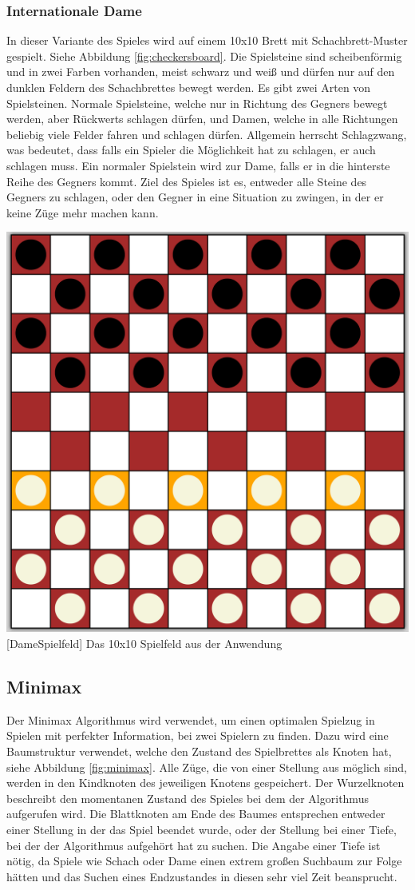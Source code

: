 \documentclass[12pt,a4paper,bibliography=totocnumbered,listof=totocnumbered]{article}
\begin{document}
\subsubsection{Internationale Dame}
In dieser Variante des Spieles wird auf einem 10x10 Brett mit Schachbrett-Muster gespielt.
Siehe Abbildung \ref{fig:checkersboard}. Die Spielsteine
sind scheibenförmig und in zwei Farben vorhanden, meist schwarz und weiß und dürfen nur auf den dunklen
Feldern des Schachbrettes bewegt werden. Es gibt zwei Arten von Spielsteinen. Normale Spielsteine, welche
nur in Richtung des Gegners bewegt werden, aber Rückwerts schlagen dürfen, und Damen, welche
in alle Richtungen beliebig viele Felder fahren und schlagen dürfen. Allgemein herrscht Schlagzwang,
was bedeutet, dass falls ein Spieler die Möglichkeit hat zu schlagen, er auch schlagen muss.
Ein normaler Spielstein wird zur Dame, falls er in die hinterste Reihe des Gegners kommt.
Ziel des Spieles ist es, entweder alle Steine des Gegners zu schlagen, oder den Gegner in eine Situation
zu zwingen, in der er keine Züge mehr machen kann. \cite{InternationalCheckersRules}

\vspace{1em}
\begin{minipage}{\linewidth}
	\centering
	\includegraphics[width=0.5\linewidth]{pics/checkersboard.png}
	[DameSpielfeld]{ Das 10x10 Spielfeld aus der Anwendung }
	\label{fig:checkersboard}
\end{minipage}

\subsection{Minimax}
\label{chap:Minimax}
Der Minimax Algorithmus wird verwendet, um einen optimalen Spielzug in Spielen mit perfekter Information, bei zwei Spielern
zu finden. Dazu wird eine Baumstruktur verwendet, welche den Zustand des Spielbrettes als Knoten hat, siehe Abbildung \ref{fig:minimax}.
Alle Züge, die von einer Stellung aus möglich sind, werden in den Kindknoten des jeweiligen Knotens gespeichert.
Der Wurzelknoten beschreibt den momentanen Zustand des Spieles bei dem der Algorithmus aufgerufen wird. Die Blattknoten am Ende des Baumes
entsprechen entweder einer Stellung in der das Spiel beendet wurde, oder der Stellung bei einer Tiefe, bei der der Algorithmus 
aufgehört hat zu suchen. Die Angabe einer Tiefe ist nötig,
da Spiele wie Schach oder Dame einen extrem großen Suchbaum zur Folge hätten und das Suchen eines Endzustandes in diesen sehr viel Zeit
beansprucht. \cite{MinimaxComparison}
\end{document}

